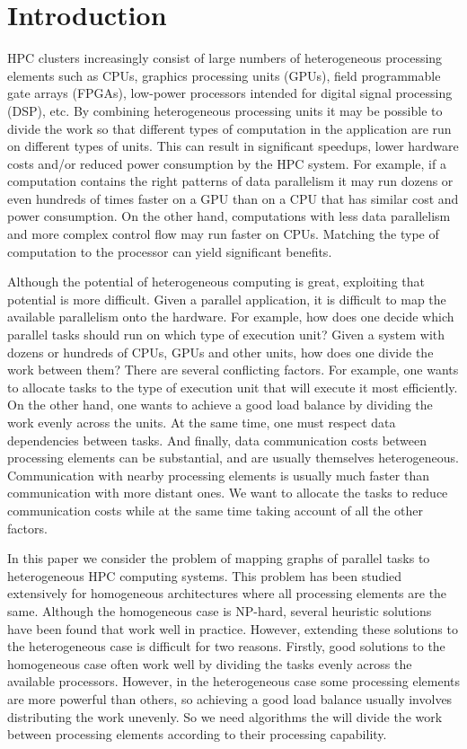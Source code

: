 \section{Introduction}
\label{sec:introduction}

HPC clusters increasingly consist of large numbers of heterogeneous
processing elements such as CPUs, graphics processing units (GPUs),
field programmable gate arrays (FPGAs), low-power processors intended
for digital signal processing (DSP), etc. By combining heterogeneous
processing units it may be possible to divide the work so that different
types of computation in the application are run on different types of
units. This can result in significant speedups, lower hardware costs
and/or reduced power consumption by the HPC system.  For example, if a
computation contains the right patterns of data parallelism it may run
dozens or even hundreds of times faster on a GPU than on a CPU that has
similar cost and power consumption. On the other hand, computations with
less data parallelism and more complex control flow may run faster on
CPUs. Matching the type of computation to the processor can yield
significant benefits.

Although the potential of heterogeneous computing is great, exploiting
that potential is more difficult. Given a parallel application, it is
difficult to map the available parallelism onto the hardware. For
example, how does one decide which parallel tasks should run on which
type of execution unit? Given a system with dozens or hundreds of CPUs,
GPUs and other units, how does one divide the work between them?  There
are several conflicting factors. For example, one wants to allocate
tasks to the type of execution unit that will execute it most
efficiently. On the other hand, one wants to achieve a good load balance
by dividing the work evenly across the units. At the same time, one must
respect data dependencies between tasks. And finally, data communication
costs between processing elements can be substantial, and are usually
themselves heterogeneous. Communication with nearby processing elements
is usually much faster than communication with more distant ones. We
want to allocate the tasks to reduce communication costs while at the
same time taking account of all the other factors.

In this paper we consider the problem of mapping graphs of parallel
tasks to heterogeneous HPC computing systems. This problem has been
studied extensively for homogeneous architectures where all processing
elements are the same. Although the homogeneous case is NP-hard, several
heuristic solutions have been found that work well in practice. However,
extending these solutions to the heterogeneous case is difficult for two
reasons. Firstly, good solutions to the homogeneous case often work well
by dividing the tasks evenly across the available processors. However,
in the heterogeneous case some processing elements are more powerful
than others, so achieving a good load balance usually involves
distributing the work unevenly. So we need algorithms the will divide
the work between processing elements according to their processing
capability.

